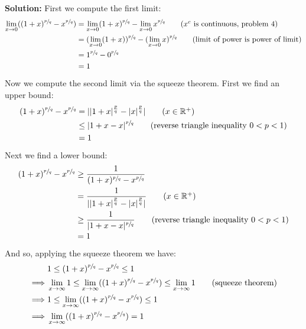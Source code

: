 \documentclass{article}
\newcommand{\R}{\mathbb R}
\begin{document}
\noindent\textbf{Solution:} First we compute the first limit:
\begin{align*}
  \lim_{x\to0}((1+x)^{\sfrac{p}{q}}-x^{\sfrac{p}{q}})&=\lim_{x\to0}(1+x)^{\sfrac{p}{q}}-\lim_{x\to0}x^{\sfrac{p}{q}}\tag{$x^c$ is continuous, problem 4}\\
  &=(\lim_{x\to0}(1+x))^{\sfrac{p}{q}}-(\lim_{x\to0}x)^{\sfrac{p}{q}}\tag{limit of power is power of limit}\\
  &=1^{\sfrac{p}{q}}-0^{\sfrac{p}{q}}\\
  &=1
\end{align*}

Now we compute the second limit via the squeeze theorem. First we find an upper bound:
\begin{align*}
  (1+x)^{\sfrac{p}{q}}-x^{\sfrac{p}{q}}&=||1+x|^{\frac{p}{q}}-|x|^{\frac{p}{q}}|\tag{$x\in\R^+$}\\
  &\le|1+x-x|^{\sfrac{p}{q}}\tag{reverse triangle inequality $0<p<1$}\\
  &=1
\end{align*}

Next we find a lower bound:
\begin{align*}
  (1+x)^{\sfrac{p}{q}}-x^{\sfrac{p}{q}}&\ge\frac{1}{(1+x)^{\sfrac{p}{q}}-x^{\sfrac{p}{q}}}\\
  &=\frac{1}{||1+x|^{\frac{p}{q}}-|x|^{\frac{p}{q}}|}\tag{$x\in\R^+$}\\
  &\ge\frac{1}{|1+x-x|^{\sfrac{p}{q}}}\tag{reverse triangle inequality $0<p<1$}\\
  &=1
\end{align*}

And so, applying the squeeze theorem we have:
\begin{align*}
  &1\le(1+x)^{\sfrac{p}{q}}-x^{\sfrac{p}{q}}\le 1\\
  \implies&\lim_{x\to\infty}1\le\lim_{x\to\infty}((1+x)^{\sfrac{p}{q}}-x^{\sfrac{p}{q}})\le \lim_{x\to\infty} 1\tag{squeeze theorem}\\
  \implies&1\le\lim_{x\to\infty}((1+x)^{\sfrac{p}{q}}-x^{\sfrac{p}{q}})\le1\\
  \implies&\lim_{x\to\infty}((1+x)^{\sfrac{p}{q}}-x^{\sfrac{p}{q}})=1\\
\end{align*}
\end{document}
